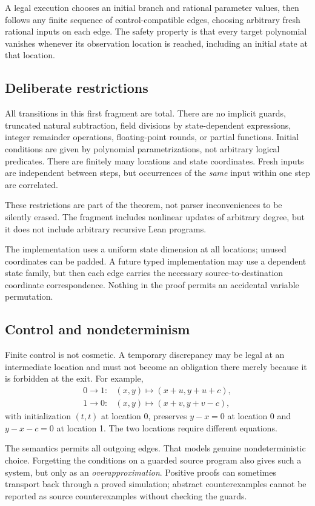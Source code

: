 \documentclass[11pt,letterpaper]{article}
\theoremstyle{definition}
\begin{document}
A legal execution chooses an initial branch and rational parameter values, then
follows any finite sequence of control-compatible edges, choosing arbitrary
fresh rational inputs on each edge. The safety property is that every target
polynomial vanishes whenever its observation location is reached, including an
initial state at that location.

\subsection{Deliberate restrictions}
All transitions in this first fragment are total. There are no implicit guards,
truncated natural subtraction, field divisions by state-dependent expressions,
integer remainder operations, floating-point rounds, or partial functions.
Initial conditions are given by polynomial parametrizations, not arbitrary
logical predicates. There are finitely many locations and state coordinates.
Fresh inputs are independent between steps, but occurrences of the \emph{same}
input within one step are correlated.

These restrictions are part of the theorem, not parser inconveniences to be
silently erased. The fragment includes nonlinear updates of arbitrary degree,
but it does not include arbitrary recursive Lean programs.

The implementation uses a uniform state dimension at all locations; unused
coordinates can be padded. A future typed implementation may use a dependent
state family, but then each edge carries the necessary source-to-destination
coordinate correspondence. Nothing in the proof permits an accidental variable
permutation.

\subsection{Control and nondeterminism}
Finite control is not cosmetic. A temporary discrepancy may be legal at an
intermediate location and must not become an obligation there merely because it
is forbidden at the exit. For example,
\[
\begin{array}{ll}
0\to1:& (x,y)\mapsto(x+u,y+u+c),\\
1\to0:& (x,y)\mapsto(x+v,y+v-c),
\end{array}
\]
with initialization $(t,t)$ at location 0, preserves $y-x=0$ at location 0 and
$y-x-c=0$ at location 1. The two locations require different equations.

The semantics permits all outgoing edges. That models genuine nondeterministic
choice. Forgetting the conditions on a guarded source program also gives such
a system, but only as an \emph{overapproximation}. Positive proofs can sometimes
transport back through a proved simulation; abstract counterexamples cannot
be reported as source counterexamples without checking the guards.
\end{document}
